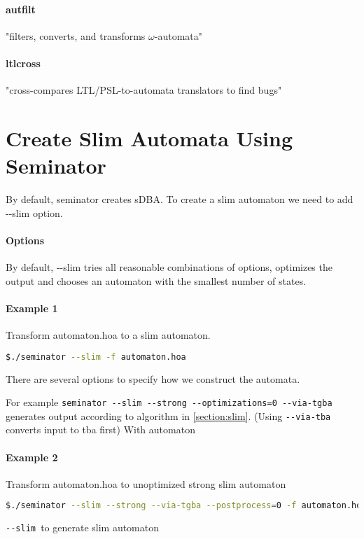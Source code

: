 \documentclass[
	digital,
nolof, nolot
]{fithesis3}
\begin{document}
	\paragraph{autfilt} "filters, converts, and transforms $\omega$-automata"  \cite{spot}
	\paragraph{ltlcross} "cross-compares LTL/PSL-to-automata translators to find bugs" \cite{spot}
		\section{Create Slim Automata Using Seminator}
		By default, seminator creates sDBA. To create a slim automaton we need to add -{}-slim option. 
		\paragraph{Options} By default, -{}-slim tries all reasonable combinations of options, optimizes the output and chooses an automaton with the smallest number of states.
		
		\paragraph{Example 1}
		Transform automaton.hoa to a slim automaton.

		\begin{lstlisting}[language=bash]
$./seminator --slim -f automaton.hoa
		\end{lstlisting}
		
		There are several options to specify how we construct the automata.
		
		For example \texttt{seminator -{}-slim -{}-strong -{}-optimizations=0 -{}-via-tgba} generates output according to algorithm in \ref{section:slim}. (Using \texttt{-{}-via-tba} converts input to tba first) With automaton
		
		
		\paragraph{Example 2}
		Transform automaton.hoa to unoptimized strong slim automaton
		\begin{lstlisting}[language=bash]
$./seminator --slim --strong --via-tgba --postprocess=0 -f automaton.hoa
		\end{lstlisting}
		
		 
		
		\texttt{-{}-slim }to generate slim automaton
		
\end{document}
